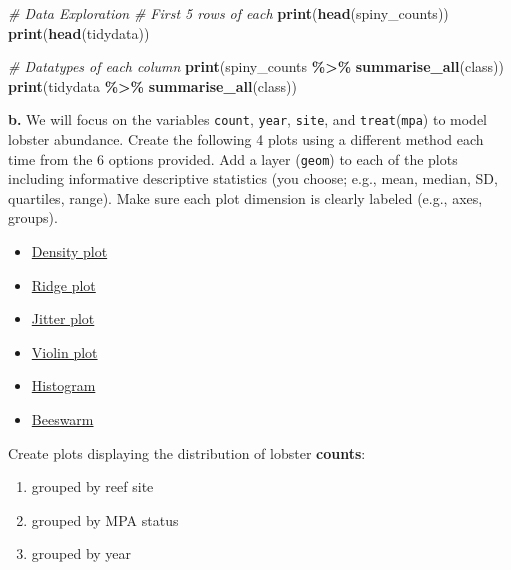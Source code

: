 \documentclass[
]{article}
\newenvironment{Shaded}{\begin{snugshade}}{\end{snugshade}}
\newcommand{\CommentTok}[1]{\textcolor[rgb]{0.56,0.35,0.01}{\textit{#1}}}
\newcommand{\FunctionTok}[1]{\textcolor[rgb]{0.13,0.29,0.53}{\textbf{#1}}}
\newcommand{\NormalTok}[1]{#1}
\newcommand{\SpecialCharTok}[1]{\textcolor[rgb]{0.81,0.36,0.00}{\textbf{#1}}}
\providecommand{\tightlist}{%
  \setlength{\itemsep}{0pt}\setlength{\parskip}{0pt}}
\begin{document}
\begin{Shaded}
\begin{Highlighting}[]
\CommentTok{\# Data Exploration}
\CommentTok{\# First 5 rows of each}
\FunctionTok{print}\NormalTok{(}\FunctionTok{head}\NormalTok{(spiny\_counts))}
\FunctionTok{print}\NormalTok{(}\FunctionTok{head}\NormalTok{(tidydata))}

\CommentTok{\# Datatypes of each column}
\FunctionTok{print}\NormalTok{(spiny\_counts }\SpecialCharTok{\%\textgreater{}\%} \FunctionTok{summarise\_all}\NormalTok{(class))}
\FunctionTok{print}\NormalTok{(tidydata }\SpecialCharTok{\%\textgreater{}\%} \FunctionTok{summarise\_all}\NormalTok{(class))}
\end{Highlighting}
\end{Shaded}

\textbf{b.} We will focus on the variables \texttt{count},
\texttt{year}, \texttt{site}, and \texttt{treat}(\texttt{mpa}) to model
lobster abundance. Create the following 4 plots using a different method
each time from the 6 options provided. Add a layer (\texttt{geom}) to
each of the plots including informative descriptive statistics (you
choose; e.g., mean, median, SD, quartiles, range). Make sure each plot
dimension is clearly labeled (e.g., axes, groups).

\begin{itemize}
\tightlist
\item
  \href{https://r-charts.com/distribution/density-plot-group-ggplot2}{Density
  plot}
\item
  \href{https://r-charts.com/distribution/ggridges/}{Ridge plot}
\item
  \href{https://ggplot2.tidyverse.org/reference/geom_jitter.html}{Jitter
  plot}
\item
  \href{https://r-charts.com/distribution/violin-plot-group-ggplot2}{Violin
  plot}
\item
  \href{https://r-charts.com/distribution/histogram-density-ggplot2/}{Histogram}
\item
  \href{https://r-charts.com/distribution/beeswarm/}{Beeswarm}
\end{itemize}

Create plots displaying the distribution of lobster \textbf{counts}:

\begin{enumerate}
\def\labelenumi{\arabic{enumi})}
\tightlist
\item
  grouped by reef site
\item
  grouped by MPA status
\item
  grouped by year
\end{enumerate}
\end{document}
